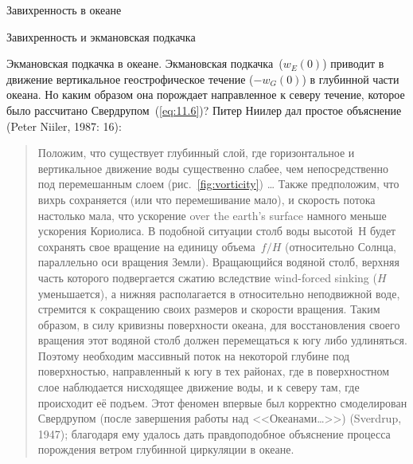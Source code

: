 \begin{chapter}{Завихренность в океане}
\begin{section}{Завихренность и экмановская подкачка}
\begin{paragraph}{Экмановская подкачка в океане.}
Экмановская подкачка~($w_E (0)$) приводит в движение вертикальное
геострофическое течение ($-w_G(0)$) в глубинной части океана. Но каким образом
она порождает направленное к северу течение, которое было рассчитано
Свердрупом~(\ref{eq:11.6})? Питер Ниилер дал простое 
объяснение (Peter Niiler, 1987: 16):
%
\begin{quotation}
Положим, что существует глубинный слой, где горизонтальное и
вертикальное движение воды существенно слабее, чем непосредственно под
перемешанным слоем
(рис.~\ref{fig:vorticity}) \dots{} Также предположим, что вихрь
сохраняется (или что перемешивание мало), и скорость потока настолько мала,
что ускорение over the earth's surface намного меньше ускорения
Кориолиса. В подобной ситуации столб воды высотой~$Н$ будет сохранять
свое вращение на единицу объема~$f/H$ (относительно Солнца, параллельно
оси вращения Земли). Вращающийся водяной столб, верхняя часть которого 
подвергается сжатию вследствие wind-forced sinking ($H$ уменьшается), 
а нижняя располагается в относительно неподвижной воде, стремится к 
сокращению своих размеров и скорости вращения. Таким образом, в силу
кривизны поверхности океана, для восстановления своего вращения этот 
водяной столб должен перемещаться к югу либо удлиняться.
Поэтому необходим массивный поток на некоторой глубине под
поверхностью, направленный к югу в тех районах, где в поверхностном слое
наблюдается нисходящее движение воды, и к северу там, где происходит её 
подъем. Этот феномен впервые был корректно смоделирован
Свердрупом (после завершения работы над <<Океанами\dots{}>>) (Sverdrup, 1947); 
благодаря ему удалось дать правдоподобное объяснение процесса порождения 
ветром глубинной циркуляции в океане.
\end{quotation}

\end{paragraph}
\end{section}
\end{chapter}
